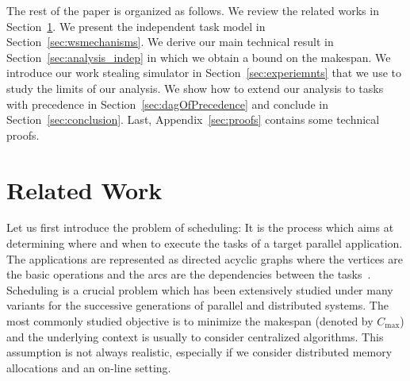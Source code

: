 The rest of the paper is organized as follows.  We review the related works
in Section~\ref{sec:relatedworks}. We present the independent task
model in Section~\ref{sec:wsmechanisms}. We derive our main technical
result in Section~\ref{sec:analysis_indep} in which we obtain a bound
on the makespan. We introduce our work stealing simulator in
Section~\ref{sec:experiemnts} that we use to study the limits of our
analysis. We show how to extend our analysis to tasks with precedence
in Section~\ref{sec:dagOfPrecedence} and conclude in
Section~\ref{sec:conclusion}.  Last, Appendix~\ref{sec:proofs} contains
some technical proofs. 

\section{Related Work}
\label{sec:relatedworks}

Let us first introduce the problem of scheduling:
It is the process which aims at determining where and when to execute the tasks of a target parallel application.
The applications are represented as directed acyclic graphs where the vertices are the basic operations and the arcs are the dependencies between the tasks~\cite{CosnardTrystram92}.
Scheduling is a crucial problem which has been extensively studied under many variants for the successive generations of parallel and distributed systems.
The most commonly studied objective is to minimize the makespan (denoted by $C_{\max}$) and the underlying context is usually to consider centralized algorithms.
This assumption is not always realistic, especially if we consider distributed memory allocations and an on-line setting.


